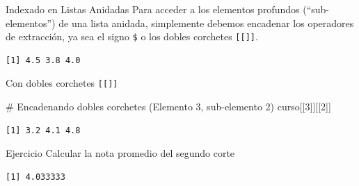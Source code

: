 \documentclass[
  ignorenonframetext,
  aspectratio=169,
  spanish,
]{beamer}
\newenvironment{Shaded}{\begin{snugshade}}{\end{snugshade}}
\newcommand{\CommentTok}[1]{\textcolor[rgb]{0.37,0.37,0.37}{#1}}
\newcommand{\DecValTok}[1]{\textcolor[rgb]{0.68,0.00,0.00}{#1}}
\newcommand{\FunctionTok}[1]{\textcolor[rgb]{0.28,0.35,0.67}{#1}}
\newcommand{\NormalTok}[1]{\textcolor[rgb]{0.00,0.23,0.31}{#1}}
\newcommand{\SpecialCharTok}[1]{\textcolor[rgb]{0.37,0.37,0.37}{#1}}
\begin{document}
\begin{frame}[fragile]{Indexado en Listas Anidadas}
\label{indexado-en-listas-anidadas}
Para acceder a los elementos profundos (``sub-elementos'') de una lista
anidada, simplemente debemos encadenar los operadores de extracción, ya
sea el signo \texttt{\$} o los dobles corchetes \texttt{{[}{[}{]}{]}}.

\begin{Shaded}
\end{Shaded}

\begin{verbatim}
[1] 4.5 3.8 4.0
\end{verbatim}
\end{frame}

\begin{frame}[fragile]{Con dobles corchetes \texttt{{[}{[}{]}{]}}}
\label{con-dobles-corchetes}
\begin{Shaded}
\begin{Highlighting}[]
\CommentTok{\# Encadenando dobles corchetes (Elemento 3, sub{-}elemento 2)}
\NormalTok{curso[[}\DecValTok{3}\NormalTok{]][[}\DecValTok{2}\NormalTok{]]}
\end{Highlighting}
\end{Shaded}

\begin{verbatim}
[1] 3.2 4.1 4.8
\end{verbatim}
\end{frame}

\begin{frame}[fragile]{Ejercicio}
\label{ejercicio-3}
Calcular la nota promedio del segundo corte

\begin{Shaded}
\end{Shaded}

\begin{verbatim}
[1] 4.033333
\end{verbatim}
\end{frame}
\end{document}
